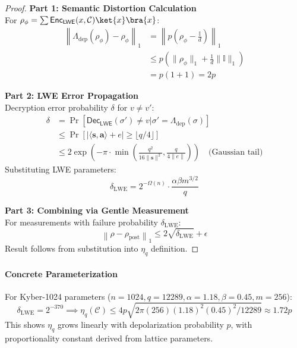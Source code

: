 \documentclass[preprint,12pt]{elsarticle}
\begin{document}
            \begin{proof}
            \textbf{Part 1: Semantic Distortion Calculation} \\
            For $\rho_\phi = \sum \mathsf{Enc}_{\mathsf{LWE}}(x, \mathcal{C}) \ket{x}\bra{x}$:
            \begin{align*}
            \left\| \Lambda_{\text{dep}}(\rho_\phi) - \rho_\phi \right\|_1 
            &= \left\| p\left(\rho_\phi - \frac{\mathbb{I}}{d}\right) \right\|_1 \\
            &\leq p \left( \|\rho_\phi\|_1 + \frac{1}{d}\|\mathbb{I}\|_1 \right) \\
            &= p\left(1 + 1\right) = 2p
            \end{align*}

            \textbf{Part 2: LWE Error Propagation} \\
            Decryption error probability $\delta$ for $v \neq v'$:
            \begin{align*}
            \delta &= \Pr[\mathsf{Dec}_{\mathsf{LWE}}(\sigma') \neq v | \sigma' = \Lambda_{\text{dep}}(\sigma)] \\
            &\leq \Pr[|\langle \mathbf{s}, \mathbf{a} \rangle + e| \geq \lfloor q/4 \rfloor] \\
            &\leq 2\exp\left(-\pi \cdot \min\left(\frac{q^2}{16\|\mathbf{s}\|^2}, \frac{q}{4\|e\|}\right)\right) \quad \text{(Gaussian tail)}
            \end{align*}
            Substituting LWE parameters:
            \begin{equation}\label{eq:lwe_error_prop}
            \delta_{\text{LWE}} = 2^{-\Omega(n)} \cdot \frac{\alpha \beta m^{3/2}}{q}
            \end{equation}

            \textbf{Part 3: Combining via Gentle Measurement} \\
            For measurements with failure probability $\delta_{\text{LWE}}$:
            \begin{equation}\label{eq:comb_gentle_mesure}
                \left\| \rho - \rho_{\text{post}} \right\|_1 \leq 2\sqrt{\delta_{\text{LWE}}} + \epsilon
            \end{equation}
            Result follows from substitution into $\eta_q$ definition.
            \end{proof}

            \paragraph{Concrete Parameterization}
            For Kyber-1024 parameters ($n=1024, q=12289, \alpha=1.18, \beta=0.45, m=256$):
            \begin{equation}\label{eq:conc_param}
                \delta_{\text{LWE}} = 2^{-370} \implies \eta_q(\mathcal{C}) \leq 4p\sqrt{2\pi(256)(1.18)^2(0.45)^2/12289} \approx 1.72p
            \end{equation}
            This shows $\eta_q$ grows linearly with depolarization probability $p$, with proportionality constant derived from lattice parameters.
\end{document}
